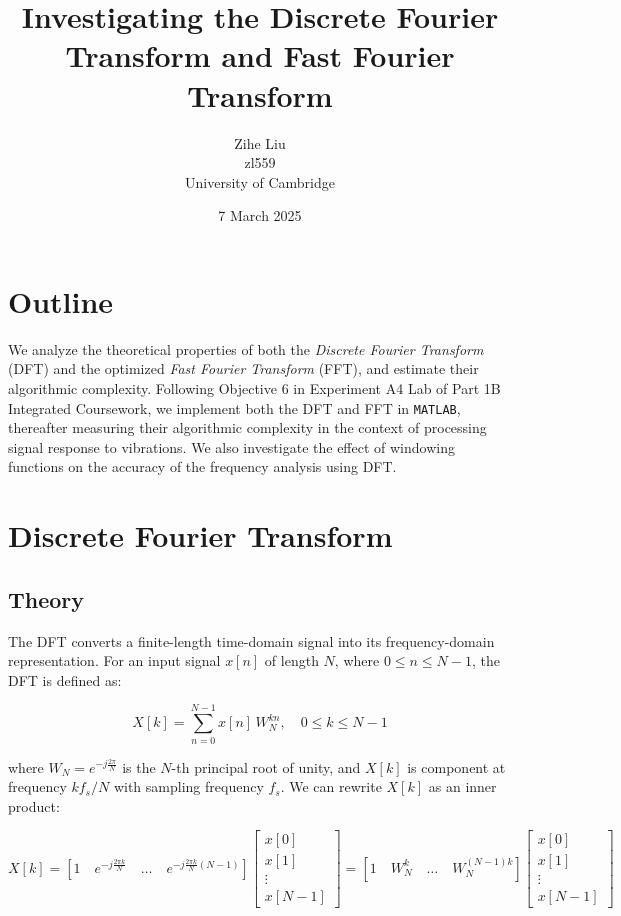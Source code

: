 \documentclass[8pt]{extarticle}
\title{Investigating the Discrete Fourier Transform and Fast Fourier Transform}
\author{Zihe Liu \\ zl559 \\ University of Cambridge}
\date{7 March 2025}
\begin{document}
\maketitle

\section{Outline}

We analyze the theoretical properties of both the \textit{Discrete Fourier Transform} (DFT) and the optimized \textit{Fast Fourier Transform} (FFT), and estimate their algorithmic complexity. Following Objective 6 in Experiment A4 Lab of Part 1B Integrated Coursework, we implement both the DFT and FFT in \texttt{MATLAB}, thereafter measuring their algorithmic complexity in the context of processing signal response to vibrations. We also investigate the effect of windowing functions on the accuracy of the frequency analysis using DFT.

\newpage
\section{Discrete Fourier Transform}

\subsection{Theory}
The DFT converts a finite-length time-domain signal into its frequency-domain representation. For an input signal $x[n]$ of length $N$, where $0 \le n \le N-1$, the DFT is defined as:

\begin{equation}
    X[k] = \sum_{n=0}^{N-1} x[n]\, W_N^{kn}, \quad 0 \le k \le N-1
\label{eq:DFT}
\end{equation}

where $W_N=e^{-j\frac{2\pi}{N}}$ is the $N$-th principal root of unity, and $X[k]$ is component at frequency $kf_s/N$ with sampling frequency $f_s$. We can rewrite $X[k]$ as an inner product:

\begin{equation*}
    X[k] = \left[ 1 \quad e^{-j\frac{2\pi k}{N}} \quad \ldots \quad e^{-j\frac{2\pi k}{N}(N-1)} \right] 
    \begin{bmatrix} 
    x[0] \\
    x[1] \\
    \vdots \\
    x[N-1]
    \end{bmatrix} 
    = \left[ 1 \quad W_N^k  \quad \ldots \quad W_N^{(N-1)k} \right] 
    \begin{bmatrix}
    x[0] \\
    x[1] \\
    \vdots \\
    x[N-1]
    \end{bmatrix}
\end{equation*}
\end{document}
